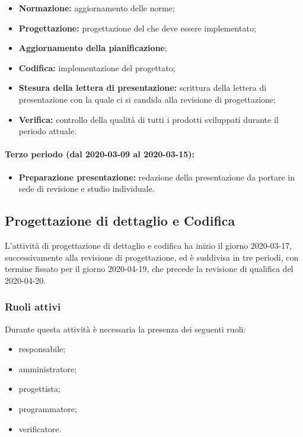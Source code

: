 					\begin{itemize}
						\item \textbf{Normazione:} aggiornamento delle norme;
						\item \textbf{Progettazione:} progettazione del  che deve essere implementato;
						\item \textbf{Aggiornamento della pianificazione};
						\item \textbf{Codifica:} implementazione del  progettato;
						\item \textbf{Stesura della lettera di presentazione:} scrittura della lettera di presentazione con la quale ci si candida alla revisione di progettazione;
						\item \textbf{Verifica:} controllo della qualità di tutti i prodotti sviluppati durante il periodo attuale.
					\end{itemize}
		
				\paragraph{Terzo periodo (dal 2020-03-09 al 2020-03-15):}
				
					\begin{itemize}
						\item \textbf{Preparazione presentazione:} redazione della presentazione da portare in sede di revisione e studio individuale.
					\end{itemize}

		\subsection{Progettazione di dettaglio e Codifica}
			
			L'attività di progettazione di dettaglio e codifica ha inizio il giorno 2020-03-17, successivamente alla revisione di progettazione, ed è suddivisa in tre periodi, con termine fissato per il giorno 2020-04-19, che precede la revisione di qualifica del 2020-04-20.
			
			\subsubsection{Ruoli attivi}
			
				Durante questa attività è necessaria la presenza dei seguenti ruoli:
				\begin{itemize}
					\item responsabile;
					\item amministratore;
					\item progettista;
					\item programmatore;
					\item verificatore.
				\end{itemize}
			
